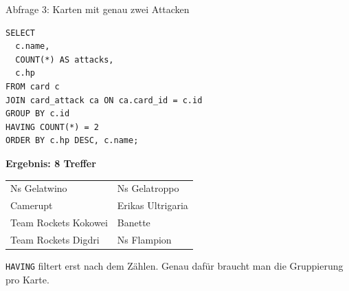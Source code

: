\documentclass[aspectratio=169,11pt]{beamer}
\begin{document}
\begin{frame}[fragile]{Abfrage 3: Karten mit genau zwei Attacken}
  \begin{minipage}[t]{0.50\textwidth}
    \begin{panel}
\begin{lstlisting}
SELECT
  c.name,
  COUNT(*) AS attacks,
  c.hp
FROM card c
JOIN card_attack ca ON ca.card_id = c.id
GROUP BY c.id
HAVING COUNT(*) = 2
ORDER BY c.hp DESC, c.name;
\end{lstlisting}
    \end{panel}
  \end{minipage}\hfill
  \begin{minipage}[t]{0.46\textwidth}
    \begin{panel}[colback=softgreen,colframe=green!40]
      {\bfseries Ergebnis: 8 Treffer}\par
      \vspace{0.2em}
      \begin{tabularx}{\linewidth}{@{}YY@{}}
        Ns Gelatwino & Ns Gelatroppo \\
        Camerupt & Erikas Ultrigaria \\
        Team Rockets Kokowei & Banette \\
        Team Rockets Digdri & Ns Flampion \\
      \end{tabularx}
      \vspace{0.35em}
      \small\color{muted}\texttt{HAVING} filtert erst nach dem Z\"ahlen. Genau daf\"ur braucht man die Gruppierung pro Karte.
    \end{panel}
  \end{minipage}
\end{frame}
\end{document}
